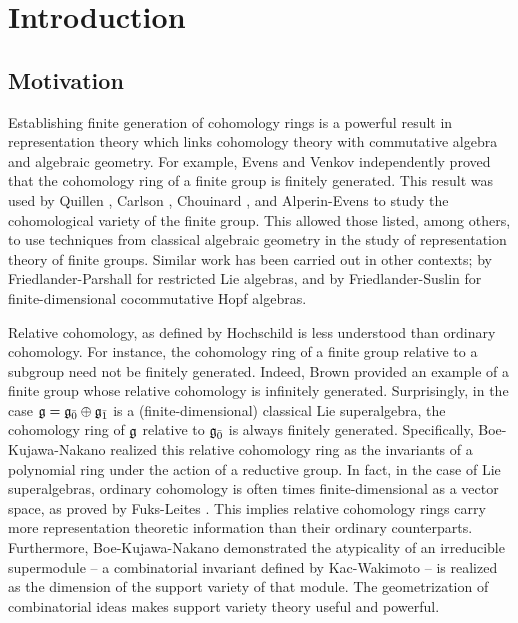 \chapter{Introduction}
\label{chap:intro}

\section{Motivation}

Establishing finite generation of cohomology rings is a powerful result in representation theory which links cohomology theory with commutative algebra and algebraic geometry. For example, Evens \cite{Evens-cohomology-ring} and Venkov \cite{MR0108788} independently proved that the cohomology ring of a finite group is finitely generated. This result was used by Quillen \cite{MR0298694}, Carlson \cite{MR723070}, Chouinard \cite{MR0401943}, and Alperin-Evens \cite{MR621284} to study the cohomological variety of the finite group. This allowed those listed, among others, to use techniques from classical algebraic geometry in the study of representation theory of finite groups. Similar work has been carried out in other contexts; by Friedlander-Parshall \cite{FP-unipotent,MR860682} for restricted Lie algebras, and by Friedlander-Suslin \cite{MR1427618} for finite-dimensional cocommutative Hopf algebras.

Relative cohomology, as defined by Hochschild \cite{hochschild} is less understood than ordinary cohomology. For instance, the cohomology ring of a finite group relative to a subgroup need not be finitely generated. Indeed, Brown \cite{MR1310744} provided an example of a finite group whose relative cohomology is infinitely generated. Surprisingly, in the case $\mathfrak{g} = {\mathfrak{g}}_{\bar{0}} \oplus {\mathfrak{g}}_{\bar{1}}$ is a (finite-dimensional) classical Lie superalgebra, the cohomology ring of $\mathfrak{g}$ relative to ${\mathfrak{g}}_{\bar{0}}$ is always finitely generated. Specifically, Boe-Kujawa-Nakano \cite{BKN-1} realized this relative cohomology ring as the invariants of a polynomial ring under the action of a reductive group. In fact, in the case of Lie superalgebras, ordinary cohomology is often times finite-dimensional as a vector space, as proved by Fuks-Leites \cite{fuks}
. This implies relative cohomology rings carry more representation theoretic information than their ordinary counterparts. Furthermore, Boe-Kujawa-Nakano \cite{BKN-1} demonstrated the atypicality of an irreducible supermodule -- a combinatorial invariant defined by Kac-Wakimoto \cite{MR1327543} -- is realized as the dimension of the support variety of that module. The geometrization of combinatorial ideas makes support variety theory useful and powerful.

